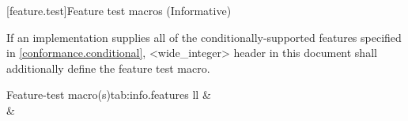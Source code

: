 
[feature.test]{Feature test macros (Informative)}

\pnum
If an implementation supplies all of the conditionally-supported features specified in \ref{conformance.conditional}, <wide_integer> header in this document shall additionally define the  feature test macro.

\begin{floattable}{Feature-test macro(s)}{tab:info.features}
{ll}
\topline
{} &  \\
\capsep
{}  & \tcode{\tsver}      \\
\end{floattable}

